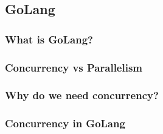 \subsection{GoLang}
\label{sub:GoLang}


\subsubsection{What is GoLang?}
\label{subs:What is GoLang?}


\subsubsection{Concurrency vs Parallelism}
\label{subs:Concurrency vs Parallism}


\subsubsection{Why do we need concurrency?}
\label{subs:Why do we need parallism}


\subsubsection{Concurrency in GoLang}
\label{subs:Concurrency in GoLang}

